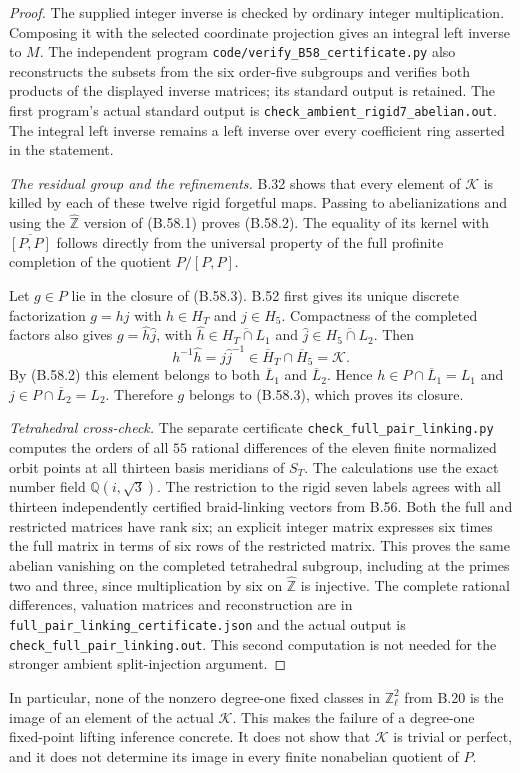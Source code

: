 \begin{proof}
The supplied integer inverse is checked by ordinary
integer multiplication.  Composing it with the selected
coordinate projection gives an integral left inverse to $M$.
The independent program
\nolinkurl{code/verify_B58_certificate.py}
also reconstructs the subsets from the six order-five
subgroups and verifies both products of the displayed
inverse matrices; its standard output is retained.
The first program's actual standard output is
\nolinkurl{check_ambient_rigid7_abelian.out}.
The integral left inverse remains a left inverse over
every coefficient ring asserted in the statement.

\emph{The residual group and the refinements.}
B.32 shows that every element of $\mathcal K$ is killed
by each of these twelve rigid forgetful maps.
Passing to abelianizations and using the
$\widehat{\mathbb Z}$ version of (B.58.1) proves
(B.58.2).  The equality of its kernel with
$\overline{[P,P]}$ follows directly from the universal
property of the full profinite completion of the quotient
$P/[P,P]$.

Let $g\in P$ lie in the closure of (B.58.3).
B.52 first gives its unique discrete factorization
$g=hj$ with $h\in H_T$ and $j\in H_5$.
Compactness of the completed factors also gives
$g=\hat h\hat j$, with
$\hat h\in\overline{H_T\cap L_1}$ and
$\hat j\in\overline{H_5\cap L_2}$.
Then
\[
 h^{-1}\hat h=j\hat j^{-1}
 \in\overline H_T\cap\overline H_5=\mathcal K.
\]
By (B.58.2) this element belongs to both
$\overline L_1$ and $\overline L_2$.
Hence $h\in P\cap\overline L_1=L_1$ and
$j\in P\cap\overline L_2=L_2$.
Therefore $g$ belongs to (B.58.3), which proves its closure.

\emph{Tetrahedral cross-check.}
The separate certificate
\nolinkurl{check_full_pair_linking.py} computes the orders
of all $55$ rational differences of the eleven finite
normalized orbit points at all thirteen basis meridians
of $S_T$.  The calculations use the exact number field
$\mathbb Q(i,\sqrt3)$.
The restriction to the rigid seven labels agrees with
all thirteen independently certified braid-linking vectors
from B.56.  Both the full and restricted matrices have rank
six; an explicit integer matrix expresses six times the
full matrix in terms of six rows of the restricted matrix.
This proves the same abelian vanishing on the completed
tetrahedral subgroup, including at the primes two and
three, since multiplication by six on
$\widehat{\mathbb Z}$ is injective.
The complete rational differences, valuation matrices and
reconstruction are in
\nolinkurl{full_pair_linking_certificate.json} and the
actual output is \nolinkurl{check_full_pair_linking.out}.
This second computation is not needed for the stronger
ambient split-injection argument.
\end{proof}

In particular, none of the nonzero degree-one fixed classes
in $\mathbb Z_\ell^2$ from B.20 is the image of an element
of the actual $\mathcal K$.
This makes the failure of a degree-one fixed-point lifting
inference concrete.  It does not show that $\mathcal K$ is
trivial or perfect, and it does not determine its image
in every finite nonabelian quotient of $P$.
